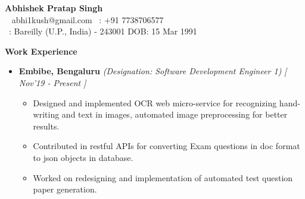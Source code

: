 \documentclass[a4paper,10pt]{article}
\newcommand{\resheading}[1]{{\small \colorbox{mygrey}{\begin{minipage}{0.988\textwidth}{\textbf{ \vphantom{p\^{E}} \large #1}}\end{minipage}}}}
\begin{document}
\textbf{\large{Abhishek Pratap Singh}}\\
\vspace{.1cm}
\indent \Letter ~ abhi1kush@gmail.com \kern 6pc \hfill \phone ~: +91 7738706577 \\
\faHome ~: \indent Bareilly (U.P., India) - 243001 \hfill DOB:
15 Mar 1991

\vspace{0.1cm}
\smallskip
\resheading{Work Experience}
\vspace{-0.4cm}
\begin{itemize}
\item \textbf{Embibe, Bengaluru} 
\emph{(Designation: Software Development Engineer 1)} \hfill {\emph{[ Nov'19 - Present ]}} \\[-0.6cm]
\begin{itemize}
\item Designed and implemented OCR web micro-service for recognizing hand-writing and text in images, automated image preprocessing for better results.
\item Contributed in restful APIs for converting Exam questions in doc format to json objects in database.
\item Worked on redesigning and implementation of automated test question paper generation.  
\end{itemize}
\end{itemize}
\end{document}
